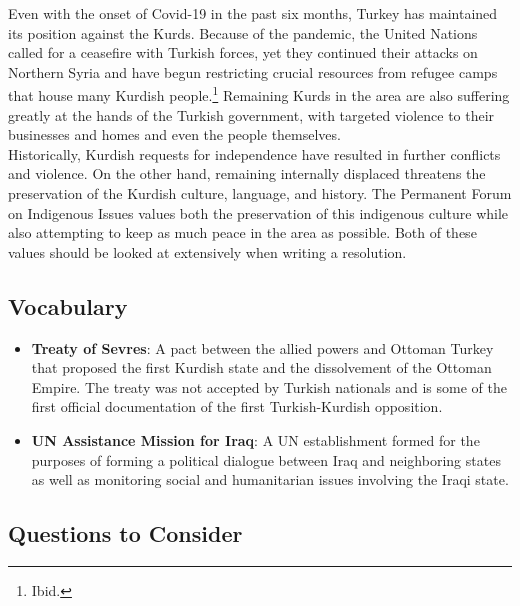 \documentclass[10pt, letterpaper]{article}
\begin{document}
Even with the onset of Covid-19 in the past six months, Turkey has
maintained its position against the Kurds. Because of the pandemic, the
United Nations called for a ceasefire with Turkish forces, yet they
continued their attacks on Northern Syria and have begun restricting
crucial resources from refugee camps that house many Kurdish
people.\footnote{Ibid.} Remaining Kurds in the area are also suffering
greatly at the hands of the Turkish government, with targeted violence
to their businesses and homes and even the people themselves. \\

Historically, Kurdish requests for independence have resulted in further
conflicts and violence. On the other hand, remaining internally
displaced threatens the preservation of the Kurdish culture, language,
and history. The Permanent Forum on Indigenous Issues values both the
preservation of this indigenous culture while also attempting to keep as
much peace in the area as possible. Both of these values should be
looked at extensively when writing a resolution. \\

\subsection{Vocabulary}

\begin{itemize}
\item
  
  \textbf{Treaty of Sevres}: A pact between the allied powers and
  Ottoman Turkey that proposed the first Kurdish state and the
  dissolvement of the Ottoman Empire. The treaty was not accepted by
  Turkish nationals and is some of the first official documentation of
  the first Turkish-Kurdish opposition.
  
\item
  
  \textbf{UN Assistance Mission for Iraq}: A UN establishment formed for
  the purposes of forming a political dialogue between Iraq and
  neighboring states as well as monitoring social and humanitarian
  issues involving the Iraqi state.
  
\end{itemize}

\subsection{Questions to Consider}
\end{document}
